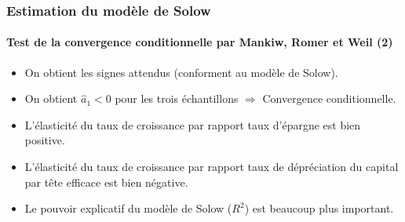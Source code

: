 \documentclass[10pt,notheorems]{beamer}
\theoremstyle{plain}
\theoremstyle{definition} %
\begin{document}
\begin{frame}
  \frametitle{Estimation du modèle de Solow}
  \framesubtitle{Test de la convergence conditionnelle par Mankiw, Romer et Weil (2)}

  \begin{itemize}

  \item On obtient les signes attendus (conforment au modèle de Solow).\newline

  \item On obtient $\hat a_1<0$ pour les trois échantillons $\Rightarrow$ Convergence conditionnelle.\newline

  \item L'élasticité du taux de croissance par rapport taux d'épargne est bien positive.\newline

  \item L'élasticité du taux de croissance par rapport taux de dépréciation du capital par tête efficace est bien négative.\newline

  \item Le pouvoir explicatif du modèle de Solow ($R^ 2$) est beaucoup plus important.

  \end{itemize}

\end{frame}
\end{document}
